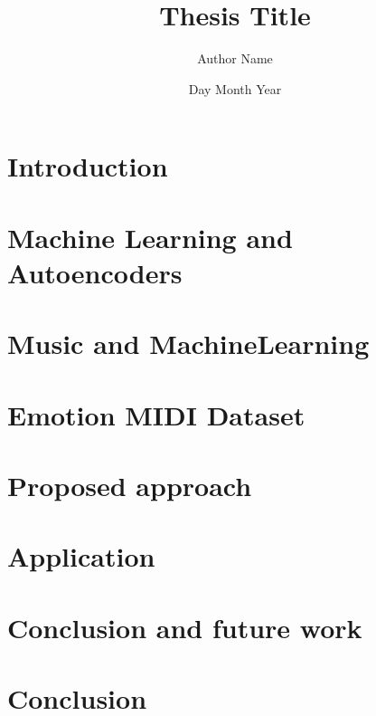 \documentclass[12pt,twoside]{report}
\title{Thesis Title}
\author{Author Name}
\date{Day Month Year}
\begin{document}







\tableofcontents

\listoffigures

\listoftables



\chapter{Introduction}


\chapter{Machine Learning and Autoencoders}


\chapter{Music and MachineLearning}


\chapter{Emotion MIDI Dataset}


\chapter{Proposed approach}


\chapter{Application}


\chapter{Conclusion and future work}


\chapter{Conclusion}
% 

% 



\end{document}
